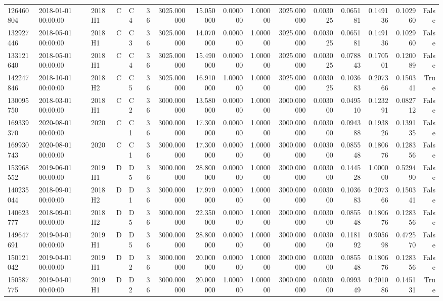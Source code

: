 \begin{tabular}{lllllrrrrrrrrrrr}
126460804 & 2018-01-01 00:00:00 & 2018H1 & C & C4 & 36 & 3025.000000 & 15.050000 & 0.000000 & 1.000000 & 3025.000000 & 0.003025 & 0.065181 & 0.149136 & 0.102960 & False \\
132927446 & 2018-05-01 00:00:00 & 2018H1 & C & C3 & 36 & 3025.000000 & 14.070000 & 0.000000 & 1.000000 & 3025.000000 & 0.003025 & 0.065181 & 0.149136 & 0.102960 & False \\
133121640 & 2018-05-01 00:00:00 & 2018H1 & C & C4 & 36 & 3025.000000 & 15.490000 & 0.000000 & 1.000000 & 3025.000000 & 0.003025 & 0.078843 & 0.170501 & 0.120089 & False \\
142247846 & 2018-10-01 00:00:00 & 2018H2 & C & C5 & 36 & 3025.000000 & 16.910000 & 1.000000 & 1.000000 & 3025.000000 & 0.003025 & 0.103683 & 0.207366 & 0.150341 & True \\
130095750 & 2018-03-01 00:00:00 & 2018H1 & C & C2 & 36 & 3000.000000 & 13.580000 & 0.000000 & 1.000000 & 3000.000000 & 0.003000 & 0.049510 & 0.123291 & 0.082712 & False \\
169339370 & 2020-08-01 00:00:00 & 2020 & C & C1 & 36 & 3000.000000 & 17.300000 & 0.000000 & 1.000000 & 3000.000000 & 0.003000 & 0.094388 & 0.193826 & 0.139135 & False \\
169930743 & 2020-08-01 00:00:00 & 2020 & C & C1 & 36 & 3000.000000 & 17.300000 & 0.000000 & 1.000000 & 3000.000000 & 0.003000 & 0.085548 & 0.180676 & 0.128356 & False \\
153968552 & 2019-06-01 00:00:00 & 2019H1 & D & D5 & 36 & 3000.000000 & 28.800000 & 0.000000 & 1.000000 & 3000.000000 & 0.003000 & 0.144528 & 1.000000 & 0.529490 & False \\
140235044 & 2018-09-01 00:00:00 & 2018H2 & D & D1 & 36 & 3000.000000 & 17.970000 & 0.000000 & 1.000000 & 3000.000000 & 0.003000 & 0.103683 & 0.207366 & 0.150341 & False \\
140623777 & 2018-09-01 00:00:00 & 2018H2 & D & D5 & 36 & 3000.000000 & 22.350000 & 0.000000 & 1.000000 & 3000.000000 & 0.003000 & 0.085548 & 0.180676 & 0.128356 & False \\
149647691 & 2019-04-01 00:00:00 & 2019H1 & D & D5 & 36 & 3000.000000 & 28.800000 & 0.000000 & 1.000000 & 3000.000000 & 0.003000 & 0.118192 & 0.905698 & 0.472570 & False \\
150121042 & 2019-04-01 00:00:00 & 2019H1 & D & D2 & 36 & 3000.000000 & 20.000000 & 0.000000 & 1.000000 & 3000.000000 & 0.003000 & 0.085548 & 0.180676 & 0.128356 & False \\
150587775 & 2019-04-01 00:00:00 & 2019H1 & D & D2 & 36 & 3000.000000 & 20.000000 & 1.000000 & 1.000000 & 3000.000000 & 0.003000 & 0.099349 & 0.201086 & 0.145131 & True \\

\end{tabular}
